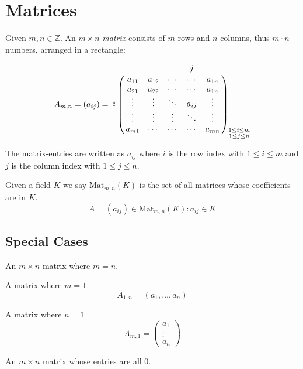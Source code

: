 \section{Matrices}
\begin{definition}[Matrix]
Given \(m, n \in \mathbb{Z}\). An \(m \times n\) \textit{matrix} consists of \(m\) rows and \(n\) columns, thus \(m \cdot n\) numbers, arranged in a rectangle:

\[
A_{m,n} = (a_{ij}) =
\bordermatrix{
   ~ & & & & j & \cr
     & a_{11} & a_{12} & \cdots & \cdots & a_{1n} \cr
     & a_{21} & a_{22} & \cdots & \cdots & a_{1n} \cr
   i & \vdots & \vdots & \ddots & a_{ij} & \vdots \cr
     & \vdots & \vdots & \vdots & \ddots & \vdots \cr
     & a_{m1} & \cdots & \cdots & \cdots & a_{mn} \cr
}_{\substack{1 \leq i \leq m \\ 1 \leq j \leq n}}
\]

The matrix-entries are written as \(a_{ij}\) where \(i\) is the row index with \(1 \leq i \leq m\) and \(j\) is the column index with \(1 \leq j \leq n\).

Given a field \(K\) we say \(\text{Mat}_{m,n}(K)\) is the set of all matrices whose coefficients are in \(K\).
\[A = (a_{ij}) \in \text{Mat}_{m,n}(K): a_{ij} \in K\]
\end{definition}

\subsection{Special Cases}
\begin{definition}
   An \(m \times n\) matrix where \(m = n\).
\end{definition}

\begin{definition}
   A matrix where \(m = 1\)
   \[A_{1,n} = (a_1, \ldots, a_n)\]
\end{definition}

\begin{definition}
   A matrix where \(n = 1\)
   \[A_{m,1} = \begin{pmatrix} a_1 \\ \vdots \\ a_n \end{pmatrix}\]
\end{definition}

\begin{definition}
   An \(m \times n \) matrix whose entries are all \(0\).
\end{definition}

